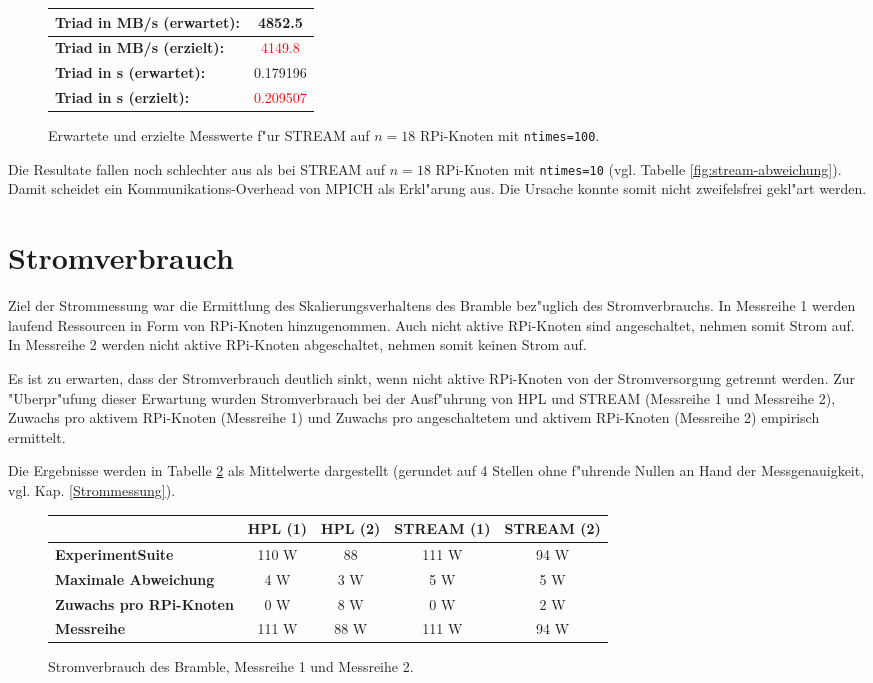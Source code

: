 \begin{enumerate}
\begin{figure}
\begin{tabular}{|l|c|}
    \textbf{Triad in MB/s (erwartet):} & 4852.5\\
    \hline 
    \textbf{Triad in MB/s (erzielt):} & \textcolor{red}{4149.8}\\
    \hline 
    \textbf{Triad in s (erwartet):} & 0.179196\\
    \hline 
    \textbf{Triad in s (erzielt):} & \textcolor{red}{0.209507}\\
    \hline 
  \end{tabular}
  \caption{Erwartete und erzielte Messwerte f"ur STREAM auf $n=18$ RPi-Knoten mit \texttt{ntimes=100}.}\label{fig:stream-ntimes100}
\end{figure}
\noindent
Die Resultate fallen noch schlechter aus als bei STREAM auf $n=18$ RPi-Knoten mit \texttt{ntimes=10} (vgl. Tabelle \ref{fig:stream-abweichung}). Damit scheidet ein Kommunikations-Overhead von MPICH als Erkl"arung aus. Die Ursache konnte somit nicht zweifelsfrei gekl"art werden. 
\end{enumerate}

\section{Stromverbrauch}
Ziel der Strommessung war die Ermittlung des Skalierungsverhaltens des Bramble bez"uglich des Stromverbrauchs. In Messreihe 1 werden laufend Ressourcen in Form von RPi-Knoten hinzugenommen. Auch nicht aktive RPi-Knoten sind angeschaltet, nehmen somit Strom auf. In Messreihe 2 werden nicht aktive RPi-Knoten abgeschaltet, nehmen somit keinen Strom auf. 

Es ist zu erwarten, dass der Stromverbrauch deutlich sinkt, wenn nicht aktive RPi-Knoten von der Stromversorgung getrennt werden. Zur "Uberpr"ufung dieser Erwartung wurden Stromverbrauch bei der Ausf"uhrung von HPL und STREAM (Messreihe 1 und Messreihe 2), Zuwachs pro aktivem RPi-Knoten (Messreihe 1) und Zuwachs pro angeschaltetem und aktivem RPi-Knoten (Messreihe 2) empirisch ermittelt. 

Die Ergebnisse werden in Tabelle \ref{fig:stromvergleich} als Mittelwerte dargestellt (gerundet auf 4 Stellen ohne f"uhrende Nullen an Hand der Messgenauigkeit, vgl. Kap. \ref{Strommessung}). 
\begin{figure}
  \centering
  \begin{tabular}{|l|c|c|c|c|}
    \hline 
    & HPL (1) & HPL (2) & STREAM (1) & STREAM (2)\\ 
    \hline 
	\textbf{ExperimentSuite} & 110 W & 88 & 111 W & 94 W\\
    \hline 
    \textbf{Maximale Abweichung} & 4 W & 3 W & 5 W & 5 W\\
	\hline
    \textbf{Zuwachs pro RPi-Knoten} & 0 W & 8 W & 0 W & 2 W\\
    \hline 
    \textbf{Messreihe} & 111 W & 88 W & 111 W & 94 W\\
    \hline 
  \end{tabular}
  \caption{Stromverbrauch des Bramble, Messreihe 1 und Messreihe 2.}
\label{fig:stromvergleich}
\end{figure}
\noindent


